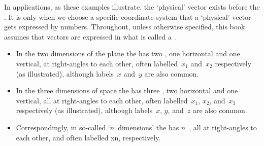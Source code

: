 In applications, as these examples illustrate, the `physical' vector exists before the .
It is only when we choose a specific coordinate system that a `physical' vector gets expressed by numbers.
Throughout, unless otherwise specified, this book assumes that vectors are expressed in what is called a .
\begin{itemize}
\item 
\begin{figbox}[\vspace{2ex}]{}%
In the two dimensions of the plane the  has two , 
one horizontal and one vertical, at right-angles to each other, often labelled~\(x_1\) and~\(x_2\) respectively (as illustrated), although labels~\(x\) and~\(y\) are also common.
\end{figbox}

\item \begin{figbox}[\vspace{5ex}]{}%
In the three dimensions of space the  has three , 
two horizontal and one vertical, all at right-angles to each other, often labelled~\(x_1\), \(x_2\), and~\(x_3\) respectively (as illustrated), although labels~\(x\), \(y\), and~\(z\) are also common.
\end{figbox}

\item Correspondingly, in so-called `\(n\)~dimensions' the  has \(n\)~, all at right-angles to each other, and often labelled \hlist xn, respectively.
\end{itemize}




